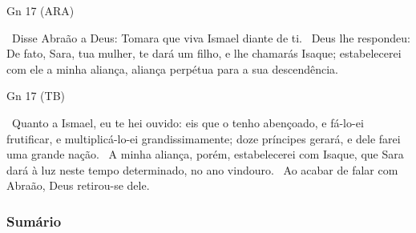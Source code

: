 \documentclass[12pt,aspectratio=169]{beamer}
\newcommand{\ver}[1]{%
    \raisebox{0.50ex}{%
        \scalebox{1.1}{%
            \pmb{\textbf{\textcolor{BSpbg}{#1}}}%
        }%
    }%
}
\newcommand{\QUOTE}[1]{%
    \par\noindent\hspace*{0.05\linewidth}%
    \begin{minipage}{0.9\linewidth}%
        \linespread{1.35}\large{#1}%
    \end{minipage}%
}
\newcommand{\YEL}[1]{{\textcolor{TXyel}{#1}}}
\newcommand{\GRE}[1]{{\textcolor{TXgre}{#1}}}
\newcommand{\CYA}[1]{{\textcolor{TXcya}{#1}}}
\newcommand{\BRI}[1]{{\textcolor{BSpbg}{#1}}}   %
\begin{document}
    \begin{frame}{\BRI{Gn 17} (ARA)}
        \QUOTE{%
            \ver{18}~Disse Abraão a Deus: Tomara que viva Ismael diante de ti.
            \ver{19}~Deus lhe respondeu: \CYA{De fato}, Sara, tua mulher, te dará um filho, e
            lhe chamarás \GRE{Isaque}; \YEL{estabelecerei com ele a minha aliança, aliança
            perpétua para a sua descendência}.
        }
    \end{frame}

    \begin{frame}{\BRI{Gn 17} (TB)}
        \QUOTE{%
            \ver{20}~Quanto a Ismael, eu te hei ouvido: eis que o tenho abençoado, e fá-lo-ei
            frutificar, e multiplicá-lo-ei grandissimamente; doze príncipes gerará, e dele farei
            uma grande nação.
            \ver{21}~\YEL{A minha aliança, porém, estabelecerei com Isaque}, que Sara dará à luz
            neste tempo determinado, no ano vindouro.
            \ver{22}~Ao acabar de falar com Abraão, Deus retirou-se dele.
        }
    \end{frame}

    \subsubsection{Sumário}
\end{document}
